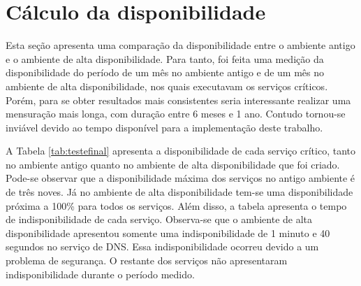 \newpage
\section{Cálculo da disponibilidade}
\label{section:comparacaofinal}

Esta seção apresenta uma comparação da disponibilidade entre o ambiente antigo e o ambiente de alta disponibilidade. 
Para tanto, foi feita uma medição da disponibilidade do período de um mês no ambiente antigo e de um mês no ambiente de alta disponibilidade, 
nos quais executavam os serviços críticos. Porém, para se obter resultados mais consistentes seria interessante realizar uma mensuração mais longa, 
com duração entre 6 meses e 1 ano. Contudo tornou-se inviável devido ao tempo disponível para a implementação deste trabalho. 

A Tabela \ref{tab:testefinal} apresenta a disponibilidade de cada serviço crítico, tanto no ambiente antigo quanto 
no ambiente de alta disponibilidade que foi criado. Pode-se observar que a disponibilidade máxima dos serviços no antigo ambiente é de 
três noves. Já no ambiente de alta disponibilidade tem-se uma disponibilidade próxima a 100\% para todos os serviços.
Além disso, a tabela apresenta o tempo de indisponibilidade de cada serviço. Observa-se que o ambiente de alta disponibilidade apresentou
somente uma indisponibilidade de 1 minuto e 40 segundos no serviço de \ac{DNS}. Essa indisponibilidade ocorreu devido a um problema de segurança. 
O restante dos serviços não apresentaram indisponibilidade durante o período medido.

